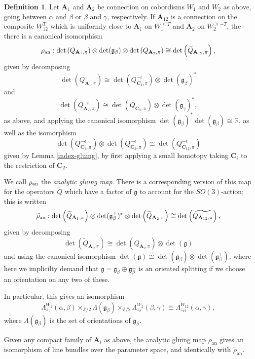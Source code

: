 \documentclass{memo-l}
\theoremstyle{definition}
\newtheorem{definition}[theorem]{Definition}
\theoremstyle{remark}
\numberwithin{section}{chapter}
\numberwithin{equation}{chapter}
\begin{document}
\begin{definition}\label{analytic-gluing}Let $\mathbf{A}_1$ and $\mathbf{A}_2$ be connection on cobordisms $W_1$ and $W_2$ as above, going between $\alpha$ and $\beta$ or $\beta$ and $\gamma$, respectively. If $\mathbf{A}_{12}$ is a connection on the composite $W_{12}^T$ which is uniformly close to $\mathbf{A}_1$ on $W_1^{\leq T}$ and $\mathbf{A}_2$ on $W_2^{\geq -T}$, the there is a canonical isomorphism $$\rho_{\textup{an}}: \det\left({Q_{\mathbf{A}_1, \pi}}\right) \otimes \det(\mathfrak g_\beta) \otimes \det\left(Q_{\mathbf{A}_2, \pi}\right) \cong \det\left(\widetilde{Q}_{\mathbf{A}_{12}, \pi}\right),$$ given by decomposing $$\det\left({Q_{\mathbf{A}_1, \pi}}\right) \cong \det\left({Q^{-\epsilon}_{\mathbf{C}_1, \pi}}\right) \otimes \det(\mathfrak g_\beta)^*$$ and $$\det\left({Q^{-\epsilon}_{\mathbf{A}_2, \pi}}\right) \cong \det\left({Q_{\mathbf{C}_2, \pi}}\right) \otimes \det(\mathfrak g_\gamma)^*,$$ as above, and applying the canonical isomorphism $\det(\mathfrak g_\beta)^* \det(\mathfrak g_\beta) \cong \mathbb R$, as well as the isomorphism $$\det\left({Q^{-\epsilon}_{\mathbf{C}_1, \pi}}\right) \otimes \det\left({Q^{-\epsilon}_{\mathbf{C}_2, \pi}}\right) \cong \det\left({Q^{-\epsilon}_{\mathbf{C}_{12}, \pi}}\right)$$ given by Lemma \ref{index-gluing}, by first applying a small homotopy taking $\mathbf{C}_i$ to the restriction of $\mathbf{C}_2$.

We call $\rho_{\textup{an}}$ the \emph{analytic gluing map}. There is a corresponding version of this map for the operators $\widetilde Q$ which have a factor of $\mathfrak g$ to account for the $SO(3)$-action; this is written
$$\widetilde \rho_{\textup{an}}: \det\left(\widetilde{Q}_{\mathbf{A}_1, \pi}\right) \otimes \det(\mathfrak g_\beta^\perp)^* \otimes \det\left(\widetilde{Q}_{\mathbf{A}_2, \pi}\right) \cong \det\left(\widetilde{Q_{\mathbf{A}_{12}, \pi}}\right),$$ given by decomposing $$\det\left(\widetilde{Q}_{\mathbf{A}_i, \pi}\right) \cong \det\left(Q_{\mathbf{A}_i, \pi}\right) \otimes \det(\mathfrak g)$$ and using the canonical isomorphism $\det(\mathfrak g) \cong \det(\mathfrak g_\beta) \otimes \det(\mathfrak g_\beta^\perp)$, where here we implicilty demand that $\mathfrak g = \mathfrak g_\beta \oplus \mathfrak g_\beta^\perp$ is an oriented splitting if we choose an orientation on any two of these.

In particular, this gives an isomorphism $$\Lambda^{W_1}_{z_1}(\alpha, \beta) \times_{\mathbb Z/2} \Lambda(\mathfrak g_\beta) \times_{\mathbb Z/2} \Lambda^{W_2}_{z_2}(\beta, \gamma) \cong \Lambda^{W_{12}}_{z_{12}}(\alpha, \gamma),$$ where $\Lambda(\mathfrak g_\beta)$ is the set of orientations of $\mathfrak g_\beta$.

Given any compact family of $\mathbf{A}_i$ as above, the analytic gluing map $\rho_{\text{an}}$ gives an isomorphism of line bundles over the parameter space, and identically with $\widetilde{\rho}_{\text{an}}$.
\end{definition}
\end{document}
